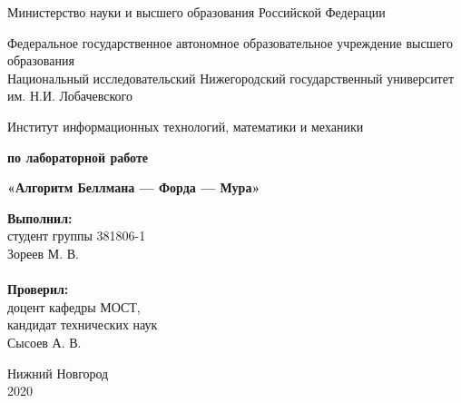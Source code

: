 \documentclass{report}
\begin{document}
\begin{titlepage}

\begin{center}
Министерство науки и высшего образования Российской Федерации
\end{center}

\begin{center}
Федеральное государственное автономное образовательное учреждение высшего образования \\
Национальный исследовательский Нижегородский государственный университет им. Н.И. Лобачевского
\end{center}

\begin{center}
Институт информационных технологий, математики и механики
\end{center}

\vspace{4em}

\begin{center}
\textbf{ по лабораторной работе} \\
\end{center}
\begin{center}
\textbf{\Large«Алгоритм Беллмана — Форда — Мура»} \\
\end{center}

\vspace{4em}

\newbox{\lbox}
\newlength{\maxl}
\setlength{\maxl}{\wd\lbox}
\hfill\parbox{7cm}{
\hspace*{5cm}\hspace*{-5cm}\textbf{Выполнил:} \\ студент группы 381806-1 \\ Зореев М. В.\\
\\
\hspace*{5cm}\hspace*{-5cm}\textbf{Проверил:}\\ доцент кафедры МОСТ, \\ кандидат технических наук \\ Сысоев А. В.\\
}
\vspace{\fill}

\begin{center} Нижний Новгород \\ 2020 \end{center}

\end{titlepage}
\end{document}

